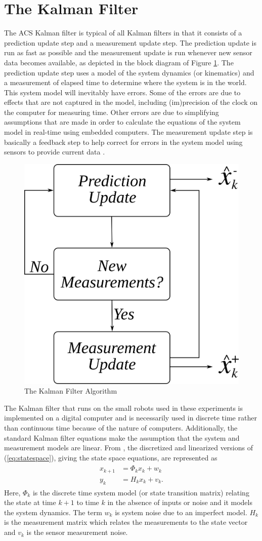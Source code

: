 \section{The Kalman Filter}
\label{sec:kalmanfilter}
The ACS Kalman filter is typical of all Kalman filters in that it consists of a prediction update step and a measurement update step. The prediction update is run as fast as possible and the measurement update is run whenever new sensor data becomes available, as depicted in the block diagram of Figure \ref{fig:kf}. The prediction update step uses a model of the system dynamics (or kinematics) and a measurement of elapsed time to determine where the system is in the world. This system model will inevitably have errors. Some of the errors are due to effects that are not captured in the model, including (im)precision of the clock on the computer for measuring time. Other errors are due to simplifying assumptions that are made in order to calculate the equations of the system model in real-time using embedded computers. The measurement update step is basically a feedback step to help correct for errors in the system model using sensors to provide current data \cite{Kelly_1994_338}.

\begin{figure}[ht!]
	\centering
	\includegraphics[width=.4\textwidth]{images/kf}
	\caption{The Kalman Filter Algorithm}
	\label{fig:kf}
\end{figure}

The Kalman filter that runs on the small robots used in these experiments is implemented on a digital computer and is necessarily used in discrete time rather than continuous time because of the nature of computers. Additionally, the standard Kalman filter equations make the assumption that the system and measurement models are linear. From \cite{Kelly_1994_338}, \cite{Simon06OptimalEstimation} the discretized and linearized versions of (\ref{eq:statespace}), giving the state space equations, are represented as
\begin{align*}
\begin{split}
x_{k+1} &= \Phi_kx_k + w_k \\
y_k &= H_kx_k + v_k.
\end{split}
\end{align*}
Here, $\Phi_k$ is the discrete time system model (or state transition matrix) relating the state at time $k+1$ to time $k$ in the absence of inputs or noise and it models the system dynamics. The term $w_k$ is system noise due to an imperfect model. $H_k$ is the measurement matrix which relates the measurements to the state vector and $v_k$ is the sensor measurement noise.


